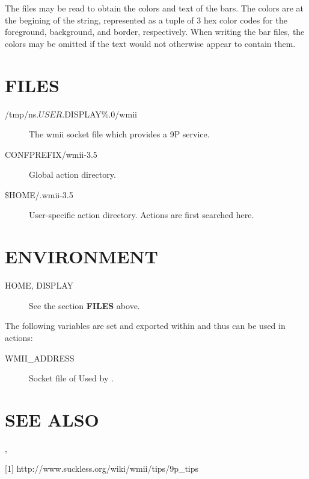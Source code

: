 The files may be read to obtain the colors and text of the bars.
The colors are at the begining of the string, represented as a
tuple of 3 hex color codes for the foreground, background, and
border, respectively. When writing the bar files, the colors may
be omitted if the text would not otherwise appear to contain
them.

\section{FILES}

\begin{description}
\item[/tmp/ns.$USER.${DISPLAY\%.0}/wmii] The wmii socket file
	which provides a 9P service.
\item[CONFPREFIX/wmii-3.5] Global action directory.
\item[\$HOME/.wmii-3.5] User-specific action directory.  Actions
	are first searched here.
\end{description}

\section{ENVIRONMENT}

\begin{description}
\item[HOME, DISPLAY] See the section \textbf{FILES} above.
\end{description}

The following variables are set and exported within  and
thus can be used in actions:

\begin{description}
\item[WMII\_ADDRESS] Socket file of Used by .
\end{description}

\section{SEE ALSO}
, 

[1] http://www.suckless.org/wiki/wmii/tips/9p\_tips

